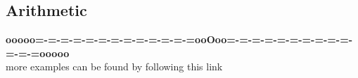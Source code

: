 \documentclass{ximera}
\begin{document}
\subsection*{Arithmetic}






























\begin{center}
\textbf{\textcolor{green!50!black}{ooooo=-=-=-=-=-=-=-=-=-=-=-=-=ooOoo=-=-=-=-=-=-=-=-=-=-=-=-=ooooo}} \\

more examples can be found by following this link\\ 

\end{center}
\end{document}
